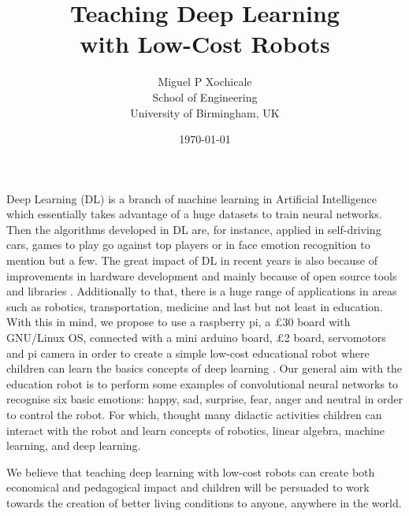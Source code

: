 \documentclass[11pt]{article}
\author{Miguel P Xochicale\\
School of Engineering\\
University of Birmingham, UK}
\title{Teaching Deep Learning  \\ with Low-Cost Robots} %
\date{\today}
\begin{document}
\maketitle


Deep Learning (DL) is a branch of machine learning in Artificial Intelligence
which essentially takes advantage of a huge datasets to train neural networks.
Then the algorithms developed in DL are, for instance, applied in self-driving cars,
games to play go against top players or in face emotion recognition to mention but 
a few. 
The great impact of DL in recent years is also because of improvements in 
hardware development and mainly because of open source tools and libraries \cite{matelabs2017}.
Additionally to that, there is a huge range of applications in areas such as robotics,
transportation, medicine and last but not least in education.
With this in mind, we propose to use a raspberry pi, a $\pounds$30 board with
GNU/Linux OS, connected with a mini arduino board, $\pounds$2 board,  servomotors 
and pi camera in order to create a simple low-cost educational robot 
where children can learn the basics concepts of deep learning  \cite{durr2015}.
Our general aim with the education robot is to perform some examples of 
convolutional neural networks to recognise six basic emotions:
happy, sad, surprise, fear, anger and neutral \cite{ho2016, Ruiz-Garcia2016}
in order to control the robot. For which, thought many didactic activities 
children can interact with the robot and learn concepts of robotics, linear algebra, 
machine learning, and deep learning.

We believe that teaching deep learning with low-cost robots can create
both economical and pedagogical impact and children will be persuaded to work
towards the creation of better living conditions to anyone, anywhere in the world.




% 
\end{document}
